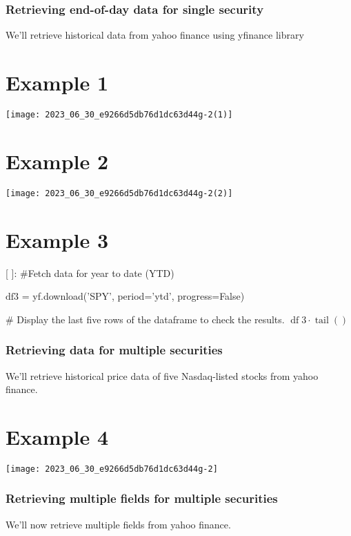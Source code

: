 \documentclass[10pt]{article}
\begin{document}
\subsubsection*{Retrieving end-of-day data for single security}
We'll retrieve historical data from yahoo finance using yfinance library

\section*{Example 1}
\begin{center}
\texttt{[image: 2023\_06\_30\_e9266d5db76d1dc63d44g-2(1)]}
\end{center}

\section*{Example 2}
\begin{center}
\texttt{[image: 2023\_06\_30\_e9266d5db76d1dc63d44g-2(2)]}
\end{center}

\section*{Example 3}
[ ]: \#Fetch data for year to date (YTD)

$\mathrm{df} 3$ = yf.download('SPY', period='ytd', progress=False)

\# Display the last five rows of the dataframe to check the results. $\operatorname{df} 3 \cdot \operatorname{tail}()$

\subsubsection*{Retrieving data for multiple securities}
We'll retrieve historical price data of five Nasdaq-listed stocks from yahoo finance.

\section*{Example 4}
\begin{center}
\texttt{[image: 2023\_06\_30\_e9266d5db76d1dc63d44g-2]}
\end{center}

\subsubsection*{Retrieving multiple fields for multiple securities}
We'll now retrieve multiple fields from yahoo finance.
\end{document}
